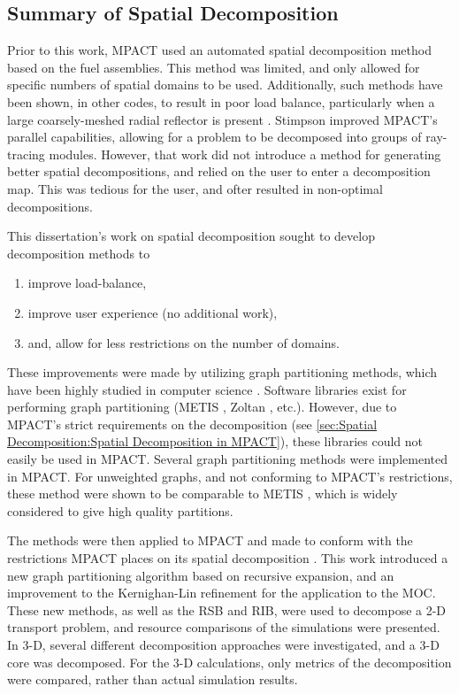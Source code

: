 {{    \subsection{Summary of Spatial Decomposition}{\label{ssec:Summary:Spatial Decomposition}
      Prior to this work, MPACT \cite{MPACT2016} used an automated spatial decomposition method based on the fuel assemblies.
      This method was limited, and only allowed for specific numbers of spatial domains to be used.
      Additionally, such methods have been shown, in other codes, to result in poor load balance, particularly when a large coarsely-meshed radial reflector is present \cite{Gunow2018}.
      Stimpson \cite{StimpsonPartitioning2017} improved MPACT's parallel capabilities, allowing for a problem to be decomposed into groups of ray-tracing modules.
      However, that work did not introduce a method for generating better spatial decompositions, and relied on the user to enter a decomposition map.
      This was tedious for the user, and ofter resulted in non-optimal decompositions.

      This dissertation's work on spatial decomposition sought to develop decomposition methods to
      \begin{enumerate}
        \item{improve load-balance,}
        \item{improve user experience (no additional work),}
        \item{and, allow for less restrictions on the number of domains.}
      \end{enumerate}
      These improvements were made by utilizing graph partitioning methods, which have been highly studied in computer science \cite{Elsner1997}.
      Software libraries exist for performing graph partitioning (METIS \cite{METIS}, Zoltan \cite{Boman2012}, etc.).
      However, due to MPACT's strict requirements on the decomposition (see \cref{sec:Spatial Decomposition:Spatial Decomposition in MPACT}), these libraries could not easily be used in MPACT.
      Several graph partitioning methods were implemented in MPACT.
      For unweighted graphs, and not conforming to MPACT's restrictions, these method were shown to be comparable to METIS \cite{Fitzgerald2017}, which is widely considered to give high quality partitions.

      The methods were then applied to MPACT and made to conform with the restrictions MPACT places on its spatial decomposition \cite{Fitzgerald2019a}.
      This work introduced a new graph partitioning algorithm based on recursive expansion, and an improvement to the Kernighan-Lin \cite{Kernighan1970} refinement for the application to the \ac{MOC}.
      These new methods, as well as the \acf{RSB} and \acf{RIB}, were used to decompose a 2-D transport problem, and resource comparisons of the simulations were presented.
      In 3-D, several different decomposition approaches were investigated, and a 3-D core was decomposed.
      For the 3-D calculations, only metrics of the decomposition were compared, rather than actual simulation results.
    }

}}
